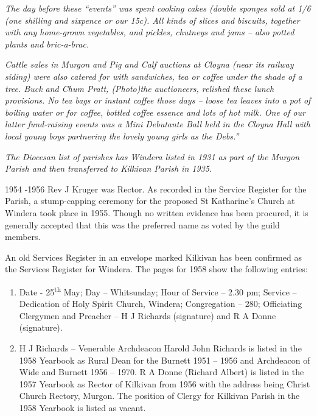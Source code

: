 \emph{The day before these ``events'' was spent cooking cakes (double sponges sold at 1/6 (one shilling and sixpence or our 15c). All kinds of slices and biscuits, together with any home-grown vegetables, and pickles, chutneys and jams -- also potted plants and bric-a-brac.}

\emph{Cattle sales in Murgon and Pig and Calf auctions at Cloyna (near its railway siding) were also catered for with sandwiches, tea or coffee under the shade of a tree. Buck and Chum Pratt, (Photo)the auctioneers, relished these lunch provisions. No tea bags or instant coffee those days -- loose tea leaves into a pot of boiling water or for coffee, bottled coffee essence and lots of hot milk. One of our latter fund-raising events was a Mini Debutante Ball held in the Cloyna Hall with local young boys partnering the lovely young girls as the Debs.''}

\emph{The Diocesan list of parishes has Windera listed in 1931 as part of the Murgon Parish and then transferred to Kilkivan Parish in 1935.}

1954 -1956 Rev J Kruger was Rector. As recorded in the Service Register for the Parish, a stump-capping ceremony for the proposed St Katharine's Church at Windera took place in 1955. Though no written evidence has been procured, it is generally accepted that this was the preferred name as voted by the guild members.

An old Services Register in an envelope marked Kilkivan has been confirmed as the Services Register for Windera. The pages for 1958 show the following entries:

\begin{enumerate}
\def\labelenumi{\arabic{enumi}.}
\item
  Date - 25\textsuperscript{th} May; Day -- Whitsunday; Hour of Service -- 2.30 pm; Service -- Dedication of Holy Spirit Church, Windera; Congregation -- 280; Officiating Clergymen and Preacher -- H J Richards (signature) and R A Donne (signature).
\item
  H J Richards -- Venerable Archdeacon Harold John Richards is listed in the 1958 Yearbook as Rural Dean for the Burnett 1951 -- 1956 and Archdeacon of Wide and Burnett 1956 -- 1970. R A Donne (Richard Albert) is listed in the 1957 Yearbook as Rector of Kilkivan from 1956 with the address being Christ Church Rectory, Murgon. The position of Clergy for Kilkivan Parish in the 1958 Yearbook is listed as vacant.
\end{enumerate}

